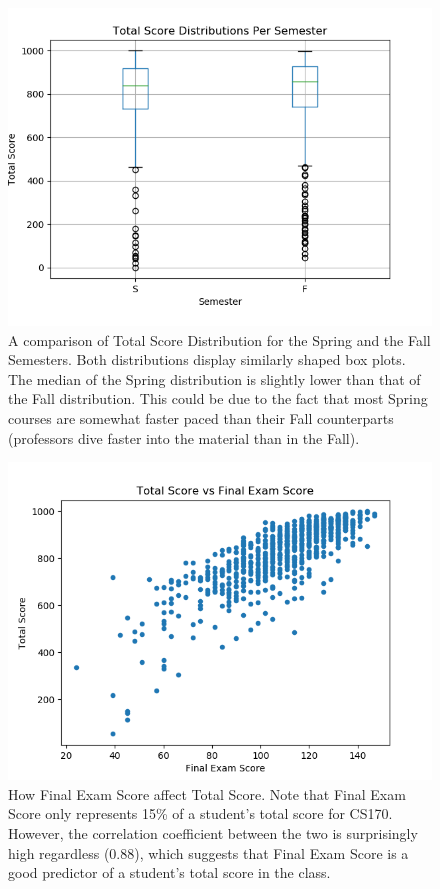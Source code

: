 \documentclass[12pt,letterpaper]{article}
\begin{document}
\begin{figure}[!htb]
  \includegraphics[width=\linewidth]{graph5.png}
  \caption{A comparison of Total Score Distribution for the Spring and the Fall Semesters. Both distributions display similarly shaped box plots. The median of the Spring distribution is slightly lower than that of the Fall distribution. This could be due to the fact that most Spring courses are somewhat faster paced than their Fall counterparts (professors dive faster into the material than in the Fall).}
\end{figure}

\begin{figure}[!htb]
  \includegraphics[width=\linewidth]{graph6.png}
  \caption{How Final Exam Score affect Total Score. Note that Final Exam Score only represents 15\% of a student's total score for CS170. However, the correlation coefficient between the two is surprisingly high regardless (0.88), which suggests that Final Exam Score is a good predictor of a student's total score in the class.}
\end{figure}
\end{document}
